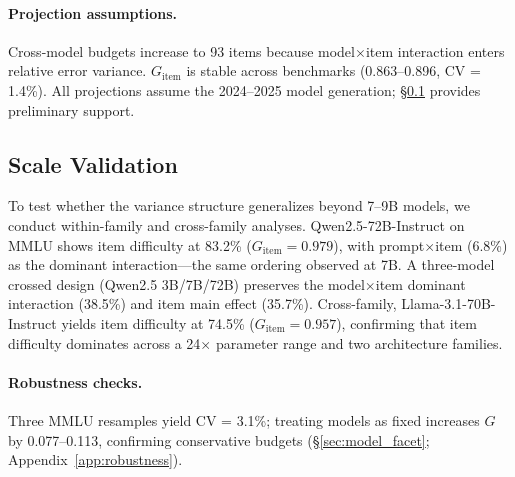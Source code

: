 \begin{table}[t]
\centering
\caption{Cross-model D-study reproducibility budgets with 95\% bootstrap CIs. $n_{G \geq 0.80}$: items needed. Multi = multi-facet (2,304 cond.); Total = items $\times$ 2,304. Single = single-condition (total evals = item count).}
\label{tab:dstudy_cross}
\scriptsize
{}
\end{table}

\paragraph{Projection assumptions.} Cross-model budgets increase to 93 items because model$\times$item interaction enters relative error variance. $G_\text{item}$ is stable across benchmarks (0.863--0.896, CV = 1.4\%). All projections assume the 2024--2025 model generation; \S\ref{sec:scale_validation} provides preliminary support.

\subsection{Scale Validation}
\label{sec:scale_validation}

To test whether the variance structure generalizes beyond 7--9B models, we conduct within-family and cross-family analyses. Qwen2.5-72B-Instruct on MMLU shows item difficulty at 83.2\% ($G_\text{item} = 0.979$), with prompt$\times$item (6.8\%) as the dominant interaction---the same ordering observed at 7B. A three-model crossed design (Qwen2.5 3B/7B/72B) preserves the model$\times$item dominant interaction (38.5\%) and item main effect (35.7\%). Cross-family, Llama-3.1-70B-Instruct yields item difficulty at 74.5\% ($G_\text{item} = 0.957$), confirming that item difficulty dominates across a 24$\times$ parameter range and two architecture families.

\paragraph{Robustness checks.} Three MMLU resamples yield CV = 3.1\%; treating models as fixed increases $G$ by 0.077--0.113, confirming conservative budgets (\S\ref{sec:model_facet}; Appendix~\ref{app:robustness}).
